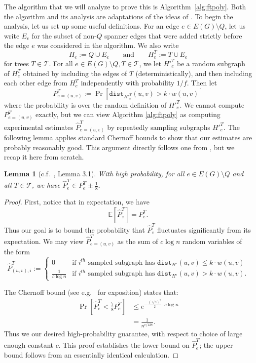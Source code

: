 \documentclass{article}
\theoremstyle{plain}
\newtheorem{lemma}[theorem]{Lemma}
\theoremstyle{definition}
\newcommand{\dist}{\texttt{dist}}
\newcommand{\tee}{\mathcal{T}}
\begin{document}
The algorithm that we will analyze to prove this is Algorithm~\ref{alg:ftpoly}.  Both the algorithm and its analysis are adaptations of the ideas of \cite{BDR21}.
To begin the analysis, let us set up some useful definitions.
For an edge $e \in E(G) \setminus Q$, let us write $E_e$ for the subset of non-$Q$ spanner edges that were added strictly before the edge $e$ was considered in the algorithm.
We also write
$$H_e := Q \cup E_e \qquad \text{and} \qquad H_e^T := T \cup E_e$$
for trees $T \in \tee$.
For all $e \in E(G) \setminus Q, T \in \tee$, we let $H'^T_e$ be a random subgraph of $H_e^T$ obtained by including the edges of $T$ (deterministically), and then including each other edge from $H_e^T$ independently with probability $1/f$.
Then let
$$P^T_{e=(u, v)} := \Pr\left[ \dist_{H'^T_e}(u, v) > k \cdot w(u, v) \right]$$
where the probability is over the random definition of $H'^T_e$.
We cannot compute $P^T_{e=(u, v)}$ exactly, but we can view Algorithm \ref{alg:ftpoly} as computing experimental estimates $\widehat{P}^T_{e=(u, v)}$ by repeatedly sampling subgraphs $H'^T_e$.
The following lemma applies standard Chernoff bounds to show that our estimates are probably reasonably good.
This argument directly follows one from \cite{BDR21}, but we recap it here from scratch.

\begin{lemma} [c.f.~\cite{BDR21}, Lemma 3.1] \label{lem:whpguarantee}
With high probability, for all $e \in E(G) \setminus Q$ and all $T \in \mathcal{T}$, we have
$\widehat{P}^T_e \in P^T_e \pm \frac{1}{8}.$
\end{lemma}
\begin{proof}
First, notice that in expectation, we have
$$\mathbb{E}\left[\widehat{P}^T_e\right] = P^T_e.$$
Thus our goal is to bound the probability that $\widehat{P}^T_e$ fluctuates significantly from its expectation.
We may view $\widehat{P}^T_{e=(u, v)}$ as the sum of $c \log n$ random variables of the form
$$\widehat{P}^T_{(u, v), i} := \begin{cases}
0 & \text{if } i^{th} \text{ sampled subgraph has } \dist_{H'}(u, v) \le k \cdot w(u, v)\\
\frac{1}{c \log n} & \text{if } i^{th} \text{ sampled subgraph has } \dist_{H'}(u, v) > k \cdot w(u, v).
\end{cases}$$

The Chernoff bound (see e.g.\ \cite{DP09} for exposition) states that:
\begin{align*}
\Pr\left[ \widehat{P}_e^T < \frac{7}{8} P_e^T \right] &\le e^{-\frac{(1/8)^2}{2} \cdot c \log n}\\
&= \frac{1}{n^{c/128}}.
\end{align*}
Thus we our desired high-probability guarantee, with respect to choice of large enough constant $c$.
This proof establishes the lower bound on $\widehat{P}^T_e$; the upper bound follows from an essentially identical calculation.
\end{proof}
\end{document}
